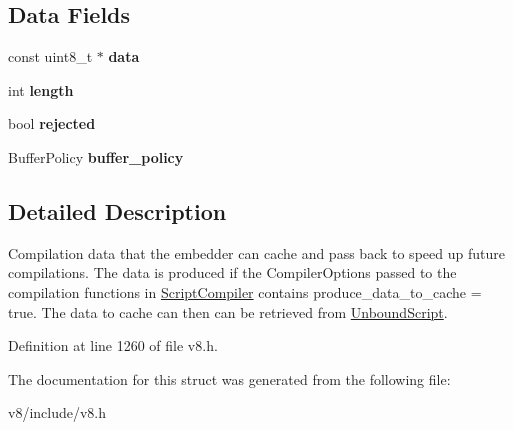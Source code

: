 \subsection*{Data Fields}
\begin{DoxyCompactItemize}
\item 
\mbox{\label{structv8_1_1ScriptCompiler_1_1CachedData_a31e313a969170116f98d5a76c110fe61}} 
const uint8\+\_\+t $\ast$ {\bfseries data}
\item 
\mbox{\label{structv8_1_1ScriptCompiler_1_1CachedData_ad7b8b1b672095a2c33621d3d5b5c7f8f}} 
int {\bfseries length}
\item 
\mbox{\label{structv8_1_1ScriptCompiler_1_1CachedData_aa1d16fbd48957df19d4cc1c886afff8f}} 
bool {\bfseries rejected}
\item 
\mbox{\label{structv8_1_1ScriptCompiler_1_1CachedData_a1e5c9ff625ac790139aec4294493fe32}} 
Buffer\+Policy {\bfseries buffer\+\_\+policy}
\end{DoxyCompactItemize}


\subsection{Detailed Description}
Compilation data that the embedder can cache and pass back to speed up future compilations. The data is produced if the Compiler\+Options passed to the compilation functions in \mbox{\hyperlink{classv8_1_1ScriptCompiler}{Script\+Compiler}} contains produce\+\_\+data\+\_\+to\+\_\+cache = true. The data to cache can then can be retrieved from \mbox{\hyperlink{classv8_1_1UnboundScript}{Unbound\+Script}}. 

Definition at line 1260 of file v8.\+h.



The documentation for this struct was generated from the following file\+:\begin{DoxyCompactItemize}
\item 
v8/include/v8.\+h\end{DoxyCompactItemize}
